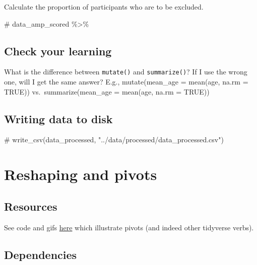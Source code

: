 \documentclass[
  letterpaper,
  DIV=11,
  numbers=noendperiod]{scrreprt}
\newenvironment{Shaded}{\begin{snugshade}}{\end{snugshade}}
\newcommand{\CommentTok}[1]{\textcolor[rgb]{0.37,0.37,0.37}{#1}}
\begin{document}
Calculate the proportion of participants who are to be excluded.

\begin{Shaded}
\begin{Highlighting}[]
\CommentTok{\# data\_amp\_scored \%\textgreater{}\%}
\end{Highlighting}
\end{Shaded}

\section{Check your learning}\label{check-your-learning-1}

What is the difference between \texttt{mutate()} and
\texttt{summarize()}? If I use the wrong one, will I get the same
answer? E.g., mutate(mean\_age = mean(age, na.rm = TRUE))
vs.~summarize(mean\_age = mean(age, na.rm = TRUE))

\section{Writing data to disk}\label{writing-data-to-disk}

\begin{Shaded}
\begin{Highlighting}[]
\CommentTok{\# write\_csv(data\_processed, "../data/processed/data\_processed.csv")}
\end{Highlighting}
\end{Shaded}


\chapter{Reshaping and pivots}\label{reshaping-and-pivots}

\section{Resources}\label{resources}

See code and gifs
\href{https://github.com/gadenbuie/tidyexplain?tab=readme-ov-file\#pivot-wider-and-longer}{here}
which illustrate pivots (and indeed other tidyverse verbs).

\section{Dependencies}\label{dependencies-2}
\end{document}
